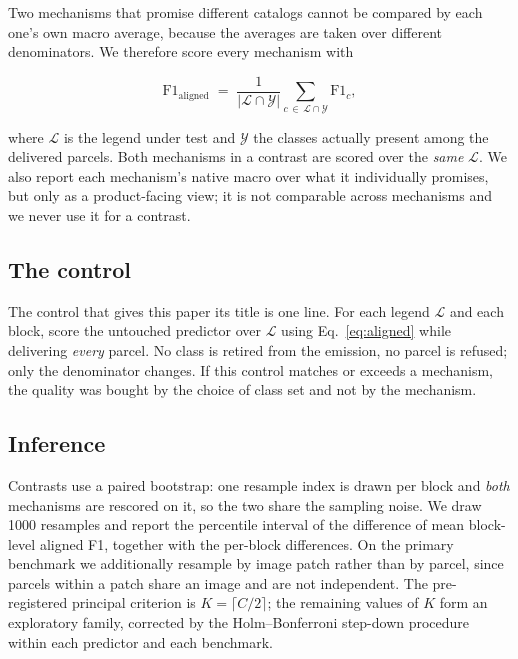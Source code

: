 Two mechanisms that promise different catalogs cannot be compared by each one's own macro average,
because the averages are taken over different denominators. We therefore score every mechanism with

\begin{equation}
  \mathrm{F1}_{\text{aligned}} \;=\; \frac{1}{|\mathcal{L} \cap \mathcal{Y}|}
  \sum_{c \,\in\, \mathcal{L} \cap \mathcal{Y}} \mathrm{F1}_c ,
  \label{eq:aligned}
\end{equation}

\noindent where $\mathcal{L}$ is the legend under test and $\mathcal{Y}$ the classes actually
present among the delivered parcels. Both mechanisms in a contrast are scored over the \emph{same}
$\mathcal{L}$. We also report each mechanism's native macro over what it individually promises, but
only as a product-facing view; it is not comparable across mechanisms and we never use it for a
contrast.

\subsection{The control}
\label{sec:control}

The control that gives this paper its title is one line. For each legend $\mathcal{L}$ and each
block, score the untouched predictor over $\mathcal{L}$ using Eq.~\ref{eq:aligned} while delivering
\emph{every} parcel. No class is retired from the emission, no parcel is refused; only the
denominator changes. If this control matches or exceeds a mechanism, the quality was bought by the
choice of class set and not by the mechanism.

\subsection{Inference}
\label{sec:inference}

Contrasts use a paired bootstrap: one resample index is drawn per block and \emph{both} mechanisms
are rescored on it, so the two share the sampling noise. We draw \num{1000} resamples and report
the percentile interval of the difference of mean block-level aligned F1, together with the
per-block differences. On the primary benchmark we additionally resample by image patch rather
than by parcel, since parcels within a patch share an image and are not independent. The
pre-registered principal criterion is $K = \lceil C/2 \rceil$; the remaining values of $K$ form an
exploratory family, corrected by the Holm--Bonferroni step-down procedure within each predictor and
each benchmark.
